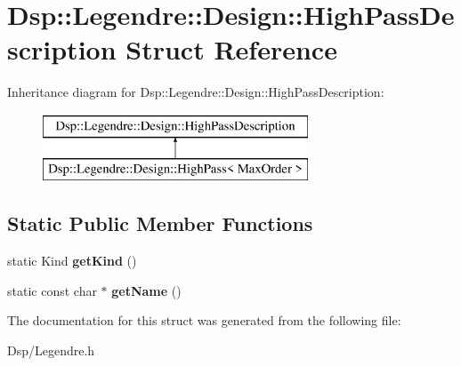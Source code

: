 \hypertarget{structDsp_1_1Legendre_1_1Design_1_1HighPassDescription}{\section{Dsp\-:\-:Legendre\-:\-:Design\-:\-:High\-Pass\-Description Struct Reference}
\label{structDsp_1_1Legendre_1_1Design_1_1HighPassDescription}
}
Inheritance diagram for Dsp\-:\-:Legendre\-:\-:Design\-:\-:High\-Pass\-Description\-:\begin{figure}[H]
\begin{center}
\leavevmode
\includegraphics[height=2.000000cm]{structDsp_1_1Legendre_1_1Design_1_1HighPassDescription}
\end{center}
\end{figure}
\subsection*{Static Public Member Functions}
\begin{DoxyCompactItemize}
\item 
\hypertarget{structDsp_1_1Legendre_1_1Design_1_1HighPassDescription_a2037ad02549f2d381771b12c9133ef1a}{static Kind {\bfseries get\-Kind} ()}\label{structDsp_1_1Legendre_1_1Design_1_1HighPassDescription_a2037ad02549f2d381771b12c9133ef1a}

\item 
\hypertarget{structDsp_1_1Legendre_1_1Design_1_1HighPassDescription_a23169c06e1853db44406ad8d258c8f3e}{static const char $\ast$ {\bfseries get\-Name} ()}\label{structDsp_1_1Legendre_1_1Design_1_1HighPassDescription_a23169c06e1853db44406ad8d258c8f3e}

\end{DoxyCompactItemize}


The documentation for this struct was generated from the following file\-:\begin{DoxyCompactItemize}
\item 
Dsp/Legendre.\-h\end{DoxyCompactItemize}
